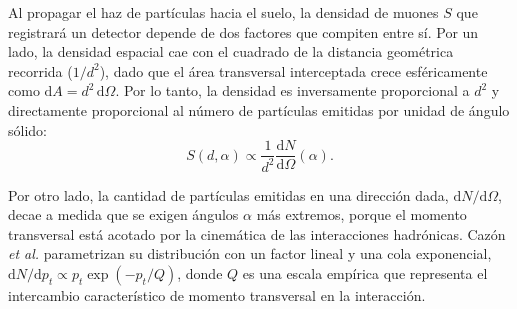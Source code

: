 Al propagar el haz de partículas hacia el suelo, la densidad de muones $S$ que registrará un detector depende de dos factores que compiten entre sí. Por un lado, la densidad espacial cae con el cuadrado de la distancia geométrica recorrida ($1/d^2$), dado que el área transversal interceptada crece esféricamente como $\mathrm{d}A = d^2\,\mathrm{d}\Omega$. Por lo tanto, la densidad es inversamente proporcional a $d^2$ y directamente proporcional al número de partículas emitidas por unidad de ángulo sólido:
\begin{equation}
	S(d, \alpha) \propto \frac{1}{d^2} \frac{\mathrm{d}N}{\mathrm{d}\Omega}(\alpha).
	\label{eq:asym_a1_previa}
\end{equation}

Por otro lado, la cantidad de partículas emitidas en una dirección dada, $\mathrm{d}N/\mathrm{d}\Omega$, decae a medida que se exigen ángulos $\alpha$ más extremos, porque el momento transversal está acotado por la cinemática de las interacciones hadrónicas. Cazón \textit{et al.} \cite{Cazon2012} parametrizan su distribución con un factor lineal y una cola exponencial, $\mathrm{d}N/\mathrm{d}p_t \propto p_t \exp(-p_t/Q)$, donde $Q$ es una escala empírica que representa el intercambio característico de momento transversal en la interacción.

